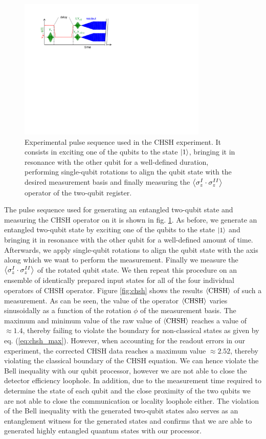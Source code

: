 \begin{figure}
	\centering
	\includegraphics[width=9cm]{"./material/figures/measurement/chsh"}
	\caption[]{Experimental pulse sequence used in the CHSH experiment. It consists in exciting one of the qubits to the state $\left| 1 \right>$, bringing it in resonance with the other qubit for a well-defined duration, performing single-qubit rotations to align the qubit state with the desired measurement basis and finally measuring the $\left< \sigma_z^I\cdot\sigma_z^{II} \right>$ operator of the two-qubit register.}
	\label{fig:chsh_pulse_sequence}
\end{figure}

The pulse sequence used for generating an entangled two-qubit state and measuring the CHSH operator on it is shown in fig. \ref{fig:chsh_pulse_sequence}. As before, we generate an entangled two-qubit state by exciting one of the qubits to the state $\left| 1 \right>$ and bringing it in resonance with the other qubit for a well-defined amount of time. Afterwards, we apply single-qubit rotations to align the qubit state with the axis along which we want to perform the measurement. Finally we measure the $\left< \sigma_z^I\cdot \sigma_z^{II} \right>$ of the rotated qubit state. We then repeat this procedure on an ensemble of identically prepared input states for all of the four individual operators of CHSH operator. Figure \ref{fig:chsh} shows the results $\left< \mathrm{CHSH} \right>$ of such a measurement. As can be seen, the value of the operator $\left< \mathrm{CHSH} \right>$ varies sinusoidally as a function of the rotation $\phi$ of the measurement basis. The maximum and minimum value of the raw value of $\left< \mathrm{CHSH} \right>$ reaches a value of $\approx 1.4$, thereby failing to violate the boundary for non-classical states as given by eq. (\ref{eq:chsh_max}). However, when accounting for the readout errors in our experiment, the corrected CHSH data reaches a maximum value $\approx 2.52$, thereby violating the classical boundary of the CHSH equation. We can hence violate the Bell inequality with our qubit processor, however we are not able to close the detector efficiency loophole. In addition, due to the measurement time required to determine the state of each qubit and the close proximity of the two qubits we are not able to close the communication or locality loophole either. The violation of the Bell inequality with the generated two-qubit states also serves as an entanglement witness for the generated states and confirms that we are able to generated highly entangled quantum states with our processor.

